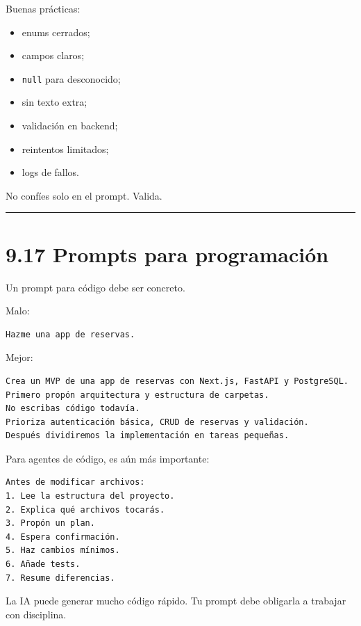 Buenas prácticas:

\begin{itemize}
\tightlist
\item
  enums cerrados;
\item
  campos claros;
\item
  \passthrough{\lstinline!null!} para desconocido;
\item
  sin texto extra;
\item
  validación en backend;
\item
  reintentos limitados;
\item
  logs de fallos.
\end{itemize}

No confíes solo en el prompt. Valida.

\begin{center}\rule{0.5\linewidth}{0.5pt}\end{center}

\section{9.17 Prompts para
programación}\label{prompts-para-programaciuxf3n}

Un prompt para código debe ser concreto.

Malo:

\begin{lstlisting}
Hazme una app de reservas.
\end{lstlisting}

Mejor:

\begin{lstlisting}
Crea un MVP de una app de reservas con Next.js, FastAPI y PostgreSQL.
Primero propón arquitectura y estructura de carpetas.
No escribas código todavía.
Prioriza autenticación básica, CRUD de reservas y validación.
Después dividiremos la implementación en tareas pequeñas.
\end{lstlisting}

Para agentes de código, es aún más importante:

\begin{lstlisting}
Antes de modificar archivos:
1. Lee la estructura del proyecto.
2. Explica qué archivos tocarás.
3. Propón un plan.
4. Espera confirmación.
5. Haz cambios mínimos.
6. Añade tests.
7. Resume diferencias.
\end{lstlisting}

La IA puede generar mucho código rápido. Tu prompt debe obligarla a
trabajar con disciplina.

